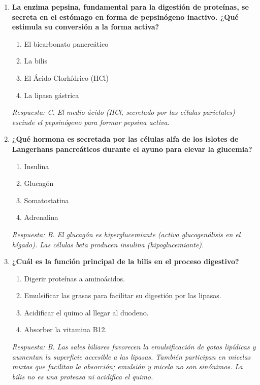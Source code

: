 \begin{enumerate}[label=\textbf{\arabic*.}]
    \item \textbf{La enzima pepsina, fundamental para la digestión de proteínas, se secreta en el estómago en forma de pepsinógeno inactivo. ¿Qué estimula su conversión a la forma activa?}
    \begin{enumerate}
        \item[A)] El bicarbonato pancreático
        \item[B)] La bilis
        \item[C)] El Ácido Clorhídrico (HCl)
        \item[D)] La lipasa gástrica
    \end{enumerate}
    \textit{Respuesta: C. El medio ácido (HCl, secretado por las células parietales) escinde el pepsinógeno para formar pepsina activa.}

    \item \textbf{¿Qué hormona es secretada por las células alfa de los islotes de Langerhans pancreáticos durante el ayuno para elevar la glucemia?}
    \begin{enumerate}
        \item[A)] Insulina
        \item[B)] Glucagón
        \item[C)] Somatostatina
        \item[D)] Adrenalina
    \end{enumerate}
    \textit{Respuesta: B. El glucagón es hiperglucemiante (activa glucogenólisis en el hígado). Las células beta producen insulina (hipoglucemiante).}

    \item \textbf{¿Cuál es la función principal de la bilis en el proceso digestivo?}
    \begin{enumerate}
        \item[A)] Digerir proteínas a aminoácidos.
        \item[B)] Emulsificar las grasas para facilitar su digestión por las lipasas.
        \item[C)] Acidificar el quimo al llegar al duodeno.
        \item[D)] Absorber la vitamina B12.
    \end{enumerate}
    \textit{Respuesta: B. Las sales biliares favorecen la emulsificación de gotas lipídicas y aumentan la superficie accesible a las lipasas. También participan en micelas mixtas que facilitan la absorción; emulsión y micela no son sinónimos. La bilis no es una proteasa ni acidifica el quimo.}


\end{enumerate}
